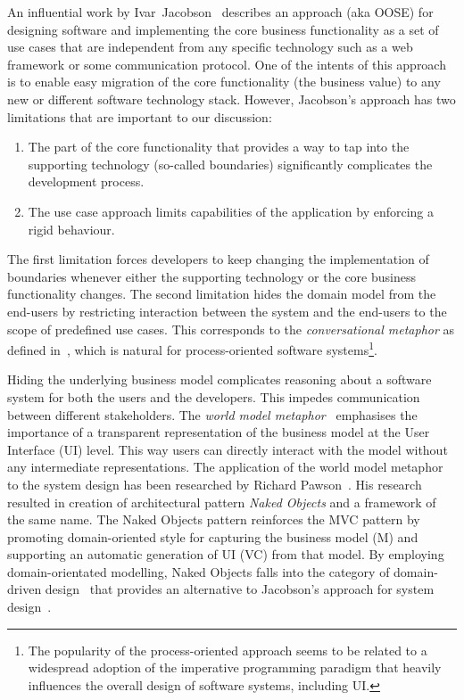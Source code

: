 \documentclass[a4paper,12pt,oneside,openright,final]{memoir} %
\begin{document}
    An influential work by Ivar~Jacobson~\cite{jacobson1992} describes an approach (aka OOSE) for designing software and implementing the core business functionality as a set of use cases that are independent from any specific technology such as a web framework or some communication protocol.
  	One of the intents of this approach is to enable easy migration of the core functionality (the business value) to any new or different software technology stack.
  	However, Jacobson's approach has two limitations that are important to our discussion:
	\begin{enumerate}
   		\item The part of the core functionality that provides a way to tap into the supporting technology (so-called boundaries) significantly complicates the development process.
   		\item The use case approach limits capabilities of the application by enforcing a rigid behaviour.
  	\end{enumerate}
  
	The first limitation forces developers to keep changing the implementation of boundaries whenever either the supporting technology or the core business functionality changes.
	The second limitation hides the domain model from the end-users by restricting interaction between the system and the end-users to the scope of predefined use cases.
	This corresponds to the \emph{conversational metaphor} as defined in~\cite{HHN1986}, which is natural for process-oriented software systems\footnote{The popularity of the process-oriented approach seems to be related to a widespread adoption of the imperative programming paradigm that heavily influences the overall design of software systems, including UI.}.

	Hiding the underlying business model complicates reasoning about a software system for both the users and the developers.
	This impedes communication between different stakeholders.  
	The \emph{world model metaphor}~\cite{HHN1986} emphasises the importance of a transparent representation of the business model at the User Interface (UI) level.
	This way users can directly interact with the model without any intermediate representations.
  	The application of the world model metaphor to the system design has been researched by Richard Pawson~\cite{pawson2001, pawson2004}.
  	His research resulted in creation of architectural pattern \emph{Naked Objects} and a framework of the same name.
  	The Naked Objects pattern reinforces the MVC pattern by promoting domain-oriented style for capturing the business model (M) and supporting an automatic generation of UI (VC) from that model.
  	By employing domain-orientated modelling, Naked Objects falls into the category of domain-driven design~\cite{haywood2009} that provides an alternative to Jacobson's approach for system design~\cite{evans2003, vernon2013}.
    
\end{document}
